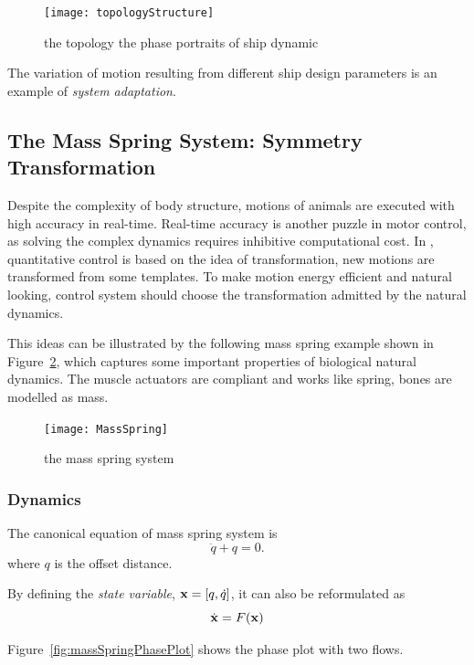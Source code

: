 \begin{figure}[!htbp]
  \begin{center}
   \texttt{[image: topologyStructure]}
   \caption{the topology  the phase portraits of ship dynamic}
   \label{fig:topologyStructure}
  \end{center}
\end{figure}

The variation of motion resulting from different ship design parameters is an example of \emph{system adaptation}.


\subsection{The Mass Spring System:  Symmetry Transformation}
Despite the complexity of body structure, motions of animals are executed with high accuracy in real-time.
Real-time accuracy is another puzzle in motor control, as solving the complex dynamics requires inhibitive computational cost.
In \moit, quantitative control is based on the idea of transformation, new motions are transformed from some templates.
To make motion energy efficient and natural looking, control system should choose the transformation admitted by the natural dynamics.

This ideas can be illustrated by the following mass spring example shown in Figure~\ref{fig:massspring}, which captures some important properties of biological natural dynamics.
The muscle actuators are compliant and works like spring,  bones are modelled as mass.

\begin{figure}[!htbp]
  \begin{center}
    \texttt{[image: MassSpring]}
    \caption{the mass spring system}
    \label{fig:massspring}
  \end{center}
\end{figure}

\subsubsection*{Dynamics}
The canonical equation of mass spring system is
\begin{equation}
\label{eq:mass-spring}
\ddot{q}+q=0.
\end{equation}
where $q$ is the offset distance.

By defining the \emph{state variable}, $\mathbf{x}=[q,\dot{q}]$, it can also be reformulated as
\[
\dot{\mathbf{x}}=F(\mathbf{x})
\]

 Figure~\ref{fig:massSpringPhasePlot} shows the phase plot with two flows.


